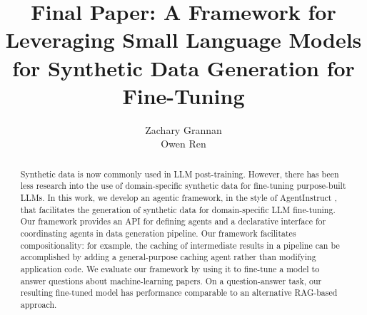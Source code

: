 \documentclass{article}
\title{Final Paper: A Framework for Leveraging Small Language Models for Synthetic Data Generation for
Fine-Tuning}
\author{%
  Zachary Grannan \\
  \And{}
  Owen Ren
}
\begin{document}
\maketitle

\begin{abstract}
Synthetic data is now commonly used in LLM post-training. However, there has
been less research into the use of domain-specific synthetic data for
fine-tuning purpose-built LLMs. In this work, we develop an agentic framework,
in the style of AgentInstruct \citep{mitra_agentinstruct_2024}, that facilitates
the generation of synthetic data for domain-specific LLM fine-tuning. Our
framework provides an API for defining agents and a declarative interface for
coordinating agents in data generation pipeline. Our framework facilitates
compositionality: for example, the caching of intermediate results in a pipeline
can be accomplished by adding a general-purpose caching agent rather than
modifying application code.  We evaluate our framework by using it to fine-tune
a model to answer questions about machine-learning papers. On a question-answer
task, our resulting fine-tuned model has performance comparable to an
alternative RAG-based approach.
\end{abstract}










\clearpage



\end{document}
